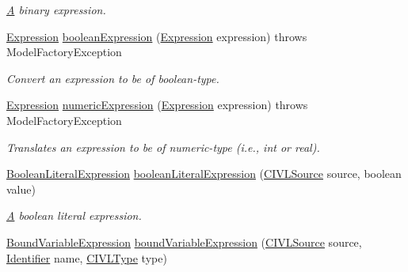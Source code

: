 \begin{DoxyCompactItemize}
\begin{DoxyCompactList}\small\item\em \hyperlink{structA}{A} binary expression. \end{DoxyCompactList}\item 
\hyperlink{interfaceedu_1_1udel_1_1cis_1_1vsl_1_1civl_1_1model_1_1IF_1_1expression_1_1Expression}{Expression} \hyperlink{interfaceedu_1_1udel_1_1cis_1_1vsl_1_1civl_1_1model_1_1IF_1_1ModelFactory_a1492d53834253ce0dee450ccaa4b2127}{boolean\+Expression} (\hyperlink{interfaceedu_1_1udel_1_1cis_1_1vsl_1_1civl_1_1model_1_1IF_1_1expression_1_1Expression}{Expression} expression)  throws Model\+Factory\+Exception
\begin{DoxyCompactList}\small\item\em Convert an expression to be of boolean-\/type. \end{DoxyCompactList}\item 
\hyperlink{interfaceedu_1_1udel_1_1cis_1_1vsl_1_1civl_1_1model_1_1IF_1_1expression_1_1Expression}{Expression} \hyperlink{interfaceedu_1_1udel_1_1cis_1_1vsl_1_1civl_1_1model_1_1IF_1_1ModelFactory_a63b00f6e1904a9e98d163e81e3373c8f}{numeric\+Expression} (\hyperlink{interfaceedu_1_1udel_1_1cis_1_1vsl_1_1civl_1_1model_1_1IF_1_1expression_1_1Expression}{Expression} expression)  throws Model\+Factory\+Exception
\begin{DoxyCompactList}\small\item\em Translates an expression to be of numeric-\/type (i.\+e., int or real). \end{DoxyCompactList}\item 
\hyperlink{interfaceedu_1_1udel_1_1cis_1_1vsl_1_1civl_1_1model_1_1IF_1_1expression_1_1BooleanLiteralExpression}{Boolean\+Literal\+Expression} \hyperlink{interfaceedu_1_1udel_1_1cis_1_1vsl_1_1civl_1_1model_1_1IF_1_1ModelFactory_a9abd91df999c14a047a8ae9ce4d2f74a}{boolean\+Literal\+Expression} (\hyperlink{interfaceedu_1_1udel_1_1cis_1_1vsl_1_1civl_1_1model_1_1IF_1_1CIVLSource}{C\+I\+V\+L\+Source} source, boolean value)
\begin{DoxyCompactList}\small\item\em \hyperlink{structA}{A} boolean literal expression. \end{DoxyCompactList}\item 
\hyperlink{interfaceedu_1_1udel_1_1cis_1_1vsl_1_1civl_1_1model_1_1IF_1_1expression_1_1BoundVariableExpression}{Bound\+Variable\+Expression} \hyperlink{interfaceedu_1_1udel_1_1cis_1_1vsl_1_1civl_1_1model_1_1IF_1_1ModelFactory_a8567aad00fd20a2605a13032daa700c6}{bound\+Variable\+Expression} (\hyperlink{interfaceedu_1_1udel_1_1cis_1_1vsl_1_1civl_1_1model_1_1IF_1_1CIVLSource}{C\+I\+V\+L\+Source} source, \hyperlink{interfaceedu_1_1udel_1_1cis_1_1vsl_1_1civl_1_1model_1_1IF_1_1Identifier}{Identifier} name, \hyperlink{interfaceedu_1_1udel_1_1cis_1_1vsl_1_1civl_1_1model_1_1IF_1_1type_1_1CIVLType}{C\+I\+V\+L\+Type} type)

\end{DoxyCompactItemize}
